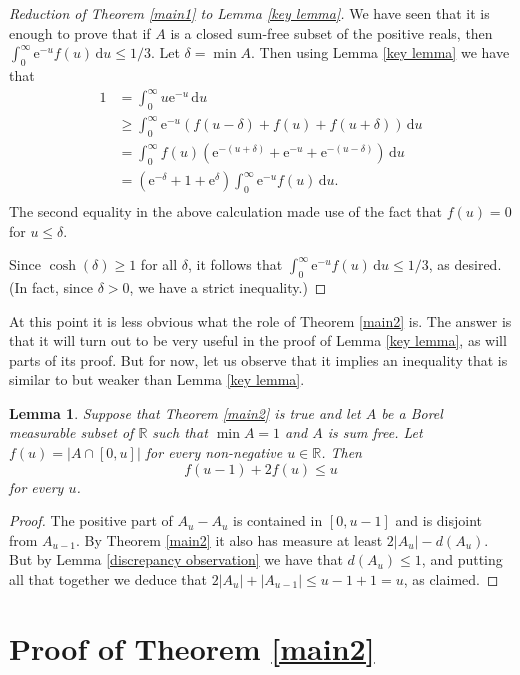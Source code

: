 \documentclass[11pt,reqno]{amsart}
\newtheorem{lemma}[theorem]{Lemma}
\theoremstyle{definition}
\def\R{\mathbb{R}}
\def\d{\delta}
\def\F#1{f(#1)}
\begin{document}
\begin{proof}[Reduction of Theorem \ref{main1} to Lemma \ref{key lemma}]

We have seen that it is enough to prove that if $A$ is a closed sum-free subset of the positive reals, then $\int_0^\infty\mathrm e^{-u}\F{u}\,\mathrm du\leq 1/3$. Let $\d=\min A$. Then using Lemma \ref{key lemma} we have that
\begin{align*}1&=\int_0^\infty u\mathrm e^{-u}\,\mathrm du\\
&\geq\int_0^\infty\mathrm e^{-u}(\F{u-\d}+\F{u}+\F{u+\d})\,\mathrm du\\
&=\int_0^\infty \F{u}(\mathrm e^{-(u+\d)}+\mathrm e^{-u}+\mathrm e^{-(u-\d)})\,\mathrm du\\
&=(\mathrm e^{-\d}+1+\mathrm e^\d)\int_0^\infty\mathrm e^{-u}\F{u}\,\mathrm du.\\
\end{align*}
The second equality in the above calculation made use of the fact that $\F{u}=0$ for $u\leq\d$.

Since $\cosh(\d)\geq 1$ for all $\d$, it follows that $\int_0^\infty \mathrm e^{-u}\F{u}\,\mathrm du\leq 1/3$, as desired. (In fact, since $\d>0$, we have a strict inequality.) 
\end{proof}

At this point it is less obvious what the role of Theorem \ref{main2} is. The answer is that it will turn out to be very useful in the proof of Lemma \ref{key lemma}, as will parts of its proof. But for now, let us observe that it implies an inequality that is similar to but weaker than Lemma \ref{key lemma}.

\begin{lemma} \label{weaker inequality}
Suppose that Theorem \ref{main2} is true and let $A$ be a Borel measurable subset of $\R$ such that $\min A=1$ and $A$ is sum free. Let $\F{u}=|A\cap[0,u]|$ for every non-negative $u\in\R$. Then 
\[\F{u-1}+2\F{u}\leq u\] 
for every $u$. 
\end{lemma}

\begin{proof} The positive part of $A_u-A_u$ is contained in $[0,u-1]$ and is disjoint from $A_{u-1}$. By Theorem \ref{main2} it also has measure at least $2|A_u|-d(A_u)$. But by Lemma \ref{discrepancy observation} we have that $d(A_u)\leq 1$, and putting all that together we deduce that $2|A_u|+|A_{u-1}|\leq u-1+1=u$, as claimed.
\end{proof}

\section{Proof of Theorem \ref{main2}}
\end{document}

